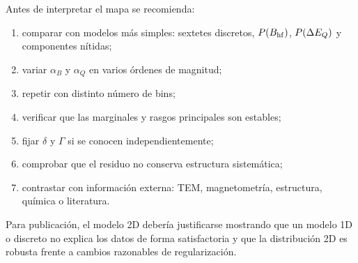 Antes de interpretar el mapa se recomienda:
\begin{enumerate}
  \item comparar con modelos más simples: sextetes discretos, $P(B_{\mathrm{hf}})$,
  $P(\Delta E_Q)$ y componentes nítidas;
  \item variar $\alpha_B$ y $\alpha_Q$ en varios órdenes de magnitud;
  \item repetir con distinto número de bins;
  \item verificar que las marginales y rasgos principales son estables;
  \item fijar $\delta$ y $\Gamma$ si se conocen independientemente;
  \item comprobar que el residuo no conserva estructura sistemática;
  \item contrastar con información externa: TEM, magnetometría, estructura,
  química o literatura.
\end{enumerate}
Para publicación, el modelo 2D debería justificarse mostrando que un modelo 1D o
discreto no explica los datos de forma satisfactoria y que la distribución 2D es
robusta frente a cambios razonables de regularización.
